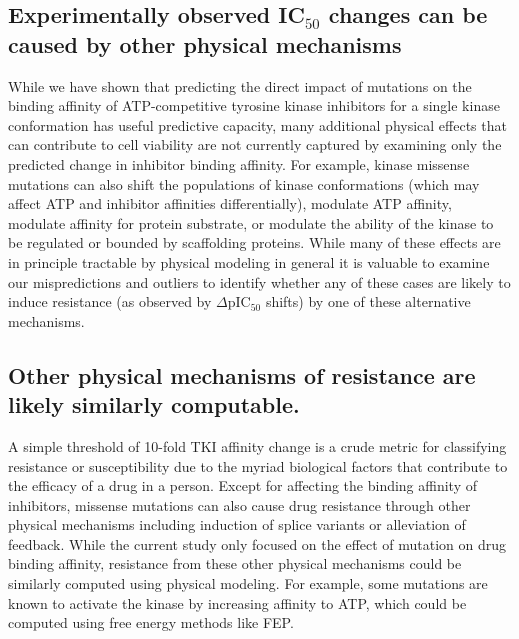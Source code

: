 \documentclass[phd,tocprelim]{cornell}
\begin{document}
\subsection{Experimentally observed IC$_{50}$ changes can be caused by other physical mechanisms}
While we have shown that predicting the direct impact of mutations on the binding affinity of ATP-competitive tyrosine kinase inhibitors for a single kinase conformation has useful predictive capacity, many additional physical effects that can contribute to cell viability are not currently captured by examining only the predicted change in inhibitor binding affinity.
For example, kinase missense mutations can also shift the populations of kinase conformations (which may affect ATP and inhibitor affinities differentially), modulate ATP affinity, modulate affinity for protein substrate, or modulate the ability of the kinase to be regulated or 
bounded by scaffolding proteins. 
While many of these effects are in principle tractable by physical modeling in general %
it is valuable to examine our mispredictions and outliers to identify whether any of these cases are likely to induce resistance (as observed by $\Delta$pIC$_{50}$ shifts) by one of these alternative mechanisms.


\subsection{Other physical mechanisms of resistance are likely similarly computable.}
A simple threshold of 10-fold TKI affinity change is a crude metric for classifying resistance or susceptibility due to the myriad biological factors that contribute to the efficacy of a drug in a person. 
Except for affecting the binding affinity of inhibitors, missense mutations can also cause drug resistance through other physical mechanisms including induction of splice variants or alleviation of feedback.
While the current study only focused on the effect of mutation on drug binding affinity, resistance from these other physical mechanisms could be similarly computed using physical modeling.
For example, some mutations are known to activate the kinase by increasing affinity to ATP, which could be computed using free energy methods like FEP. %
\end{document}
